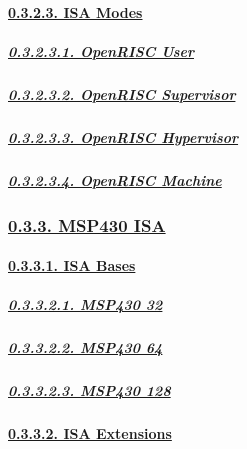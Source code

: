 \documentclass[
]{article}
\begin{document}
\hypertarget{isa-modes-1}{%
\paragraph{\texorpdfstring{\protect\hyperlink{isa-modes-4}{0.3.2.3. ISA
Modes}}{0.3.2.3. ISA Modes}}\label{isa-modes-1}}

\hypertarget{openrisc-user}{%
\subparagraph{\texorpdfstring{\protect\hyperlink{openrisc-user-1}{0.3.2.3.1.
OpenRISC User}}{0.3.2.3.1. OpenRISC User}}\label{openrisc-user}}

\hypertarget{openrisc-supervisor}{%
\subparagraph{\texorpdfstring{\protect\hyperlink{openrisc-supervisor-1}{0.3.2.3.2.
OpenRISC
Supervisor}}{0.3.2.3.2. OpenRISC Supervisor}}\label{openrisc-supervisor}}

\hypertarget{openrisc-hypervisor}{%
\subparagraph{\texorpdfstring{\protect\hyperlink{openrisc-hypervisor-1}{0.3.2.3.3.
OpenRISC
Hypervisor}}{0.3.2.3.3. OpenRISC Hypervisor}}\label{openrisc-hypervisor}}

\hypertarget{openrisc-machine}{%
\subparagraph{\texorpdfstring{\protect\hyperlink{openrisc-machine-1}{0.3.2.3.4.
OpenRISC
Machine}}{0.3.2.3.4. OpenRISC Machine}}\label{openrisc-machine}}

\hypertarget{msp430-isa}{%
\subsubsection{\texorpdfstring{\protect\hyperlink{msp430-isa-1}{0.3.3.
MSP430 ISA}}{0.3.3. MSP430 ISA}}\label{msp430-isa}}

\hypertarget{isa-bases-2}{%
\paragraph{\texorpdfstring{\protect\hyperlink{isa-bases-5}{0.3.3.1. ISA
Bases}}{0.3.3.1. ISA Bases}}\label{isa-bases-2}}

\hypertarget{msp430-32}{%
\subparagraph{\texorpdfstring{\protect\hyperlink{msp430-32-1}{0.3.3.2.1.
MSP430 32}}{0.3.3.2.1. MSP430 32}}\label{msp430-32}}

\hypertarget{msp430-64}{%
\subparagraph{\texorpdfstring{\protect\hyperlink{msp430-64-1}{0.3.3.2.2.
MSP430 64}}{0.3.3.2.2. MSP430 64}}\label{msp430-64}}

\hypertarget{msp430-128}{%
\subparagraph{\texorpdfstring{\protect\hyperlink{msp430-128-1}{0.3.3.2.3.
MSP430 128}}{0.3.3.2.3. MSP430 128}}\label{msp430-128}}

\hypertarget{isa-extensions-2}{%
\paragraph{\texorpdfstring{\protect\hyperlink{isa-extensions-5}{0.3.3.2.
ISA Extensions}}{0.3.3.2. ISA Extensions}}\label{isa-extensions-2}}
\end{document}
